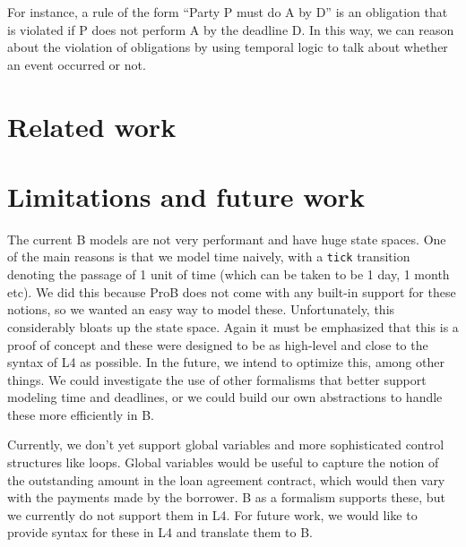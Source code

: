 \documentclass{article}
\begin{document}
For instance, a rule of the form ``Party P must do A by D'' is an obligation
that is violated if P does not perform A by the deadline D.
In this way, we can reason about the violation of obligations by using
temporal logic to talk about whether an event occurred or not.

\section{Related work}

\section{Limitations and future work}
The current B models are not very performant and have huge state spaces.
One of the main reasons is that we model time naively, with a \texttt{tick}
transition denoting the passage of 1 unit of time (which can be taken to be
1 day, 1 month etc).
We did this because ProB does not come with any built-in support for these notions,
so we wanted an easy way to model these.
Unfortunately, this considerably bloats up the state space.
Again it must be emphasized that this is a proof of concept and these were
designed to be as high-level and close to the syntax of L4 as possible.
In the future, we intend to optimize this, among other things.
We could investigate the use of other formalisms that better support modeling
time and deadlines, or we could build our own abstractions to handle these more
efficiently in B.

Currently, we don't yet support global variables and more sophisticated control
structures like loops.
Global variables would be useful to capture the notion of the outstanding amount
in the loan agreement contract, which would then vary with the payments made by
the borrower.
B as a formalism supports these, but we currently do not support them in L4.
For future work, we would like to provide syntax for these in L4 and translate
them to B.

\newpage



\end{document}
